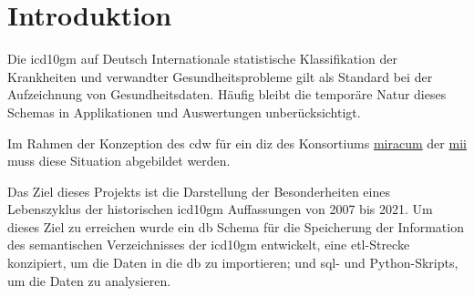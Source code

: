 \chapter{Introduktion} \label{ch:introduction}

	Die \ac{icd10gm} auf Deutsch Internationale statistische Klassifikation der Krankheiten und  verwandter Gesundheitsprobleme gilt als Standard bei der Aufzeichnung von Gesundheitsdaten. Häufig bleibt die temporäre Natur dieses Schemas in Applikationen und Auswertungen unberücksichtigt.
	
	Im Rahmen der Konzeption des \ac{cdw} für ein  \ac{diz} des Konsortiums \href{https://www.miracum.org/}{\ac{miracum}} der \href{https://www.medizininformatik-initiative.de/de}{\ac{mii}} muss diese Situation abgebildet werden.%
	
	Das Ziel dieses Projekts ist die Darstellung der Besonderheiten eines Lebenszyklus der historischen \ac{icd10gm} Auffassungen von 2007 bis 2021. Um dieses Ziel zu erreichen wurde ein \ac{db} Schema für die Speicherung der Information des semantischen Verzeichnisses der \ac{icd10gm} entwickelt, eine \ac{etl}-Strecke konzipiert, um die Daten in die \ac{db} zu importieren; und \ac{sql}- und Python-Skripts, um die Daten zu analysieren.